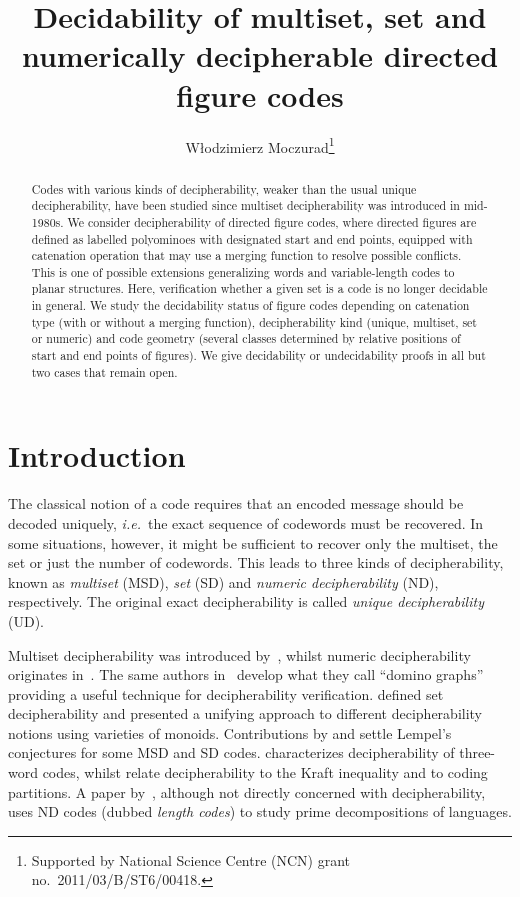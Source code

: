 \documentclass[final,nomarks]{dmtcs-episciences}
\author{W{\l}odzimierz Moczurad\thanks{Supported by National Science Centre (NCN) grant no.\ 2011/03/B/ST6/00418.}}
\title{Decidability of multiset, set and numerically decipherable directed figure codes}
\affiliation{Faculty of Mathematics and Computer Science, Jagiellonian University, 
Krak{\' o}w, Poland}
\begin{document}
\maketitle


\begin{abstract}
Codes with various kinds of decipherability, weaker than the
usual unique decipherability, have been studied since multiset
decipherability was introduced in mid-1980s. We consider
decipherability of directed figure codes, where directed figures
are defined as labelled polyominoes with designated start and
end points, equipped with catenation operation that may use a
merging function to resolve possible conflicts. This is one of
possible extensions generalizing words and variable-length codes
to planar structures.
Here, verification whether a given set is a code is no longer
decidable in general. We study the decidability status of figure
codes depending on catenation type (with or without a merging
function), decipherability kind (unique, multiset, set or
numeric) and code geometry (several classes determined by
relative positions of start and end points of figures). We give
decidability or undecidability proofs in all but two cases that
remain open.
\end{abstract}



\section{Introduction}

The classical notion of a code requires that an encoded message
should be decoded uniquely, \textit{i.e.}\ the exact sequence of
codewords must be recovered. In some situations, however, it
might be sufficient to recover only the multiset, the set or
just the number of codewords. This leads to three kinds of
decipherability, known as \textit{multiset} (MSD), \textit{set}
(SD) and \textit{numeric decipherability} (ND), respectively.
The original exact decipherability is called \textit{unique
decipherability} (UD).

Multiset decipherability was introduced 
by~\cite{Lempel}, whilst numeric decipherability originates
in~\cite{HeadWeber1}. The same authors
in~\cite{HeadWeber2} develop what they call ``domino graphs'' providing a
useful technique for decipherability verification. 
\cite{Guzman} defined set decipherability and presented a
unifying approach to different decipherability notions using
varieties of monoids. Contributions by
\cite{Restivo} and \cite{BS1}
settle Lempel's conjectures for some MSD and SD codes.
\cite{BS2} characterizes decipherability of
three-word codes, whilst \cite{BurRest1,BurRest2} relate
decipherability to the Kraft inequality and to
coding partitions. A paper by~\cite{SSY}, although not directly concerned with
decipherability, uses ND codes (dubbed \textit{length codes}) to
study prime decompositions of languages.
\end{document}
